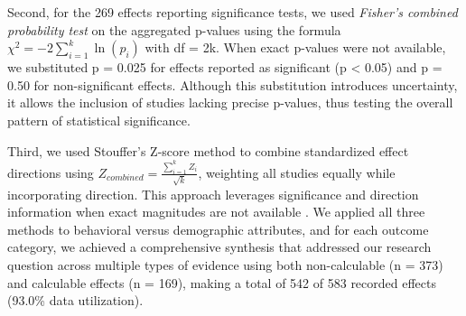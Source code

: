 \documentclass[manuscript,anonymous,sigconf]{acmart}
\begin{document}
Second, for the 269 effects reporting significance tests, we used \textit{Fisher's combined probability test} \cite{fisher1932statistical} on the aggregated p-values using the formula $\chi^2 = -2\sum_{i=1}^{k} \ln(p_i)$ with df = 2k. When exact p-values were not available, we substituted p = 0.025 for effects reported as significant (p < 0.05) and p = 0.50 for non-significant effects. Although this substitution introduces uncertainty, it allows the inclusion of studies lacking precise p-values, thus testing the overall pattern of statistical significance. %

Third, we used Stouffer's Z-score method \cite{whitlock2005combining} to combine standardized effect directions using $Z_{combined} = \frac{\sum_{i=1}^{k} Z_i}{\sqrt{k}}$, weighting all studies equally while incorporating direction. This approach leverages significance and direction information when exact magnitudes are not available \cite{whitlock2005combining}.
We applied all three methods to behavioral versus demographic attributes, and for each outcome category, we achieved a comprehensive synthesis that addressed our research question across multiple types of evidence using both  %
non-calculable (n = 373) and calculable effects (n = 169), making a total of 542 of 583 recorded effects (93.0\% data utilization). 

\end{document}
